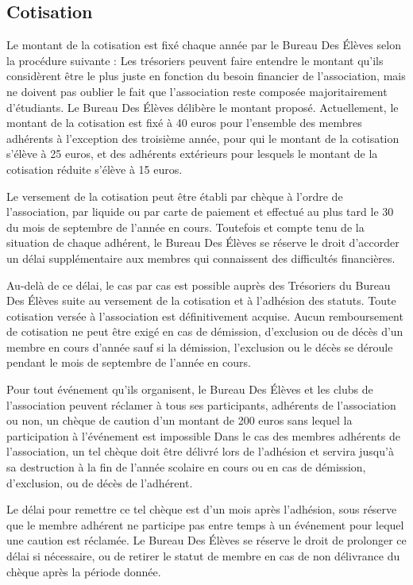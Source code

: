 \documentclass{article} %
\begin{document}
		\subsection{Cotisation}

			Le montant de la cotisation est fixé chaque année par le Bureau Des
			Élèves selon la procédure suivante : Les trésoriers peuvent faire
			entendre le montant qu’ils considèrent être le plus juste en
			fonction du besoin financier de l’association, mais ne doivent pas
			oublier le fait que l’association reste composée majoritairement
			d'étudiants. Le Bureau Des Élèves délibère le montant proposé.
			Actuellement, le montant de la cotisation est fixé à 40 euros pour
			l’ensemble des membres adhérents à l’exception des troisième année,
			pour qui le montant de la cotisation s’élève à 25 euros, et des
			adhérents extérieurs pour lesquels le montant de la cotisation
			réduite s’élève à 15 euros.

			Le versement de la cotisation peut être établi par chèque à l’ordre
			de l’association, par liquide ou par carte de paiement et effectué
			au plus tard le 30 du mois de septembre de l’année en cours.
			Toutefois et compte tenu de la situation de chaque adhérent, le
			Bureau Des Élèves se réserve le droit d’accorder un délai
			supplémentaire aux membres qui connaissent des difficultés
			financières.

			Au-delà de ce délai, le cas par cas est possible auprès des
			Trésoriers du Bureau Des Élèves suite au versement de la cotisation
			et à l’adhésion des statuts. Toute cotisation versée à l’association
			est définitivement acquise. Aucun remboursement de cotisation ne
			peut être exigé en cas de démission, d’exclusion ou de décès d’un
			membre en cours d’année sauf si la démission, l’exclusion ou le
			décès se déroule pendant le mois de septembre de l’année en cours.

			Pour tout événement qu’ils organisent, le Bureau Des Élèves et les
			clubs de l’association peuvent réclamer à tous ses participants,
			adhérents de l’association ou non, un chèque de caution d’un montant
			de 200 euros sans lequel la participation à l’événement est
			impossible Dans le cas des membres adhérents de l’association, un
			tel chèque doit être délivré lors de l’adhésion et servira jusqu’à
			sa destruction à la fin de l’année scolaire en cours ou en cas de
			démission, d’exclusion, ou de décès de l’adhérent. 

			Le délai pour remettre ce tel chèque est d’un mois après l’adhésion,
			sous réserve que le membre adhérent ne participe pas entre temps à
			un événement pour lequel une caution est réclamée. Le Bureau Des
			Élèves se réserve le droit de prolonger ce délai si nécessaire, ou
			de retirer le statut de membre en cas de non délivrance du chèque
			après la période donnée. 
\end{document}
